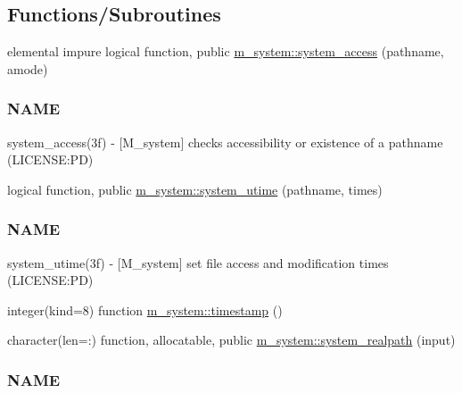 \subsection*{Functions/\+Subroutines}
\begin{DoxyCompactItemize}
\item 
elemental impure logical function, public \mbox{\hyperlink{namespacem__system_a4c1c906730e61629a8277e1daeda90f6}{m\+\_\+system\+::system\+\_\+access}} (pathname, amode)
\begin{DoxyCompactList}\small\item\em \subsubsection*{N\+A\+ME}

system\+\_\+access(3f) -\/ \mbox{[}M\+\_\+system\mbox{]} checks accessibility or existence of a pathname (L\+I\+C\+E\+N\+SE\+:PD) \end{DoxyCompactList}\item 
logical function, public \mbox{\hyperlink{namespacem__system_a83a121ba0b525210b5217565569ef350}{m\+\_\+system\+::system\+\_\+utime}} (pathname, times)
\begin{DoxyCompactList}\small\item\em \subsubsection*{N\+A\+ME}

system\+\_\+utime(3f) -\/ \mbox{[}M\+\_\+system\mbox{]} set file access and modification times (L\+I\+C\+E\+N\+SE\+:PD) \end{DoxyCompactList}\item 
integer(kind=8) function \mbox{\hyperlink{namespacem__system_a635baf5850927faa97461afaca512235}{m\+\_\+system\+::timestamp}} ()
\item 
character(len=\+:) function, allocatable, public \mbox{\hyperlink{namespacem__system_a70bbfa0a0be084b9717cbc04408041fc}{m\+\_\+system\+::system\+\_\+realpath}} (input)
\begin{DoxyCompactList}\small\item\em \subsubsection*{N\+A\+ME}


\end{DoxyCompactList}
\end{DoxyCompactItemize}
